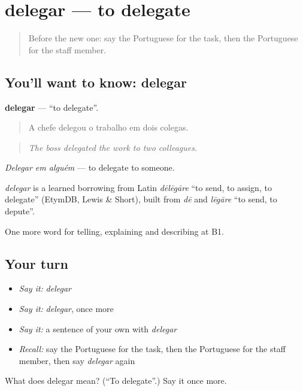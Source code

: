 \section[delegar]{delegar — to delegate}

\label{lesson:PT-C359-delegar}



\begin{quote}
Before the new one: say the Portuguese for the task, then the Portuguese for the staff member.
\end{quote}

\subsection*{You'll want to know: delegar}
\textbf{delegar} — \textquotedblleft{}to delegate\textquotedblright{}.

\begin{quote}
A chefe delegou o trabalho em dois colegas.
\end{quote}

\begin{quote}
\emph{The boss delegated the work to two colleagues.}
\end{quote}

\emph{Delegar em alguém} — to delegate to someone.

\begin{cousinweb}
\emph{delegar} is a learned borrowing from Latin \emph{dēlēgāre} \textquotedblleft{}to send, to assign, to delegate\textquotedblright{} (EtymDB, Lewis \& Short), built from \emph{dē} and \emph{lēgāre} \textquotedblleft{}to send, to depute\textquotedblright{}.
\end{cousinweb}

\begin{grammarlens}[title={What you've built}]
One more word for telling, explaining and describing at B1.
\end{grammarlens}

\subsection*{Your turn}
\begin{itemize}
\raggedright
  \item \emph{Say it:} \emph{delegar}
  \item \emph{Say it:} \emph{delegar}, once more
  \item \emph{Say it:} a sentence of your own with \emph{delegar}
  \item \emph{Recall:} say the Portuguese for the task, then the Portuguese for the staff member, then say \emph{delegar} again
\end{itemize}

\begin{tcolorbox}[breakable,colback=teal!4,colframe=teal!35!black,title={Before you move on}]
What does delegar mean? (\textquotedblleft{}To delegate\textquotedblright{}.) Say it once more.
\end{tcolorbox}
